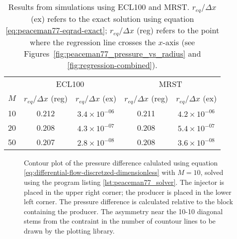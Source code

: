 \begin{table}[htbp]
\centering
    \caption{Results from simulations using ECL100 and MRST. $r_{eq}/\Delta x$ (ex) refers to the exact solution using equation \eqref{eq:peaceman77-eqrad-exact}; $r_{eq} / \Delta x$ (reg) refers to the point where the regression line crosses the $x$-axis (see Figures~\ref{fig:peaceman77_pressure_vs_radius} and \ref{fig:regression-combined}).}
    \begin{tabular}{c|cc|cc}
        \toprule
            & \multicolumn{2}{c|}{ECL100} & \multicolumn{2}{c}{MRST} \\
        $M$ &  $r_{eq}/\Delta x$ (reg) & $r_{eq}/\Delta x$ (ex) & $r_{eq}/\Delta x$ (reg) & $r_{eq}/\Delta x$ (ex) \\
        \midrule
        10  & 0.212 & $3.4\times 10^{-06}$  &  0.211 & $4.2\times 10^{-06}$ \\
        20  & 0.208 & $4.3\times 10^{-07}$  &  0.208 & $5.4\times 10^{-07}$ \\
        50  & 0.207 & $2.8\times 10^{-08}$  &  0.208 & $3.6\times 10^{-08}$ \\
        \bottomrule
    \end{tabular}
    \label{tbl:simulation-results}
\end{table}

\begin{figure}[htbp]
    \centering
    \scalebox{0.52}{}
    \caption{Contour plot of the pressure difference calulated using equation \eqref{eq:differential-flow-discretzed-dimensionless} with $M=10$, solved using the program listing \ref{lst:peaceman77_solver}. The injector is placed in the upper right corner; the producer is placed in the lower left corner. The pressure difference is calculated relative to the block containing the producer. The asymmetry near the 10-10 diagonal stems from the contraint in the number of countour lines to be drawn by the plotting library.}
    \label{fig:pressure_drop_contour}
\end{figure}

